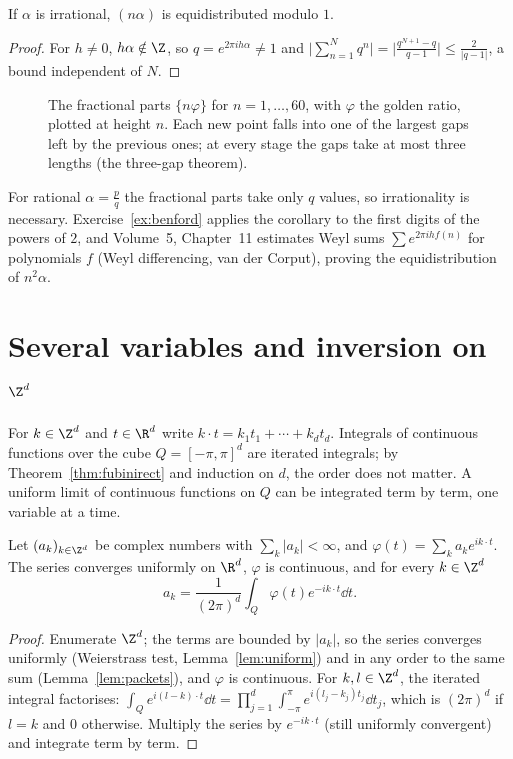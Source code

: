 \begin{corollary}\label{cor:nalpha}
If $\alpha$ is irrational, $(n\alpha)$ is equidistributed modulo $1$.
\end{corollary}
\begin{proof}
For $h\ne0$, $h\alpha\notin\Z$, so $q=e^{2\pi ih\alpha}\ne1$ and $\bigl|\sum_{n=1}^Nq^n\bigr|=\bigl|\frac{q^{N+1}-q}{q-1}\bigr|\le\frac2{|q-1|}$, a bound independent of $N$.
\end{proof}

\begin{figure}[ht]
\centering
{}
\caption{The fractional parts $\{n\varphi\}$ for $n=1,\dots,60$, with $\varphi$ the golden ratio, plotted at height $n$. Each new point
falls into one of the largest gaps left by the previous ones; at every stage the gaps take at most three lengths (the
three-gap theorem).}
\label{fig:weyl}
\end{figure}

For rational $\alpha=\frac pq$ the fractional parts take only $q$ values, so irrationality is necessary. Exercise~\ref{ex:benford} applies
the corollary to the first digits of the powers of $2$, and Volume~5, Chapter~11 estimates Weyl sums $\sum e^{2\pi ihf(n)}$ for polynomials $f$ (Weyl differencing, van der Corput), proving the equidistribution of $n^2\alpha$.

\section{Several variables and inversion on \texorpdfstring{$\Z^d$}{Zd}}

For $k\in\Z^d$ and $t\in\R^d$ write $k\cdot t=k_1t_1+\cdots+k_dt_d$. Integrals of continuous functions over the cube $Q=[-\pi,\pi]^d$ are iterated
integrals; by Theorem~\ref{thm:fubinirect} and induction on $d$, the order does not matter. A uniform limit of continuous functions on $Q$
can be integrated term by term, one variable at a time.

\begin{proposition}\label{prop:inversionZd}
Let $(a_k)_{k\in\Z^d}$ be complex numbers with $\sum_k|a_k|<\infty$, and $\varphi(t)=\sum_ka_ke^{ik\cdot t}$. The series converges uniformly on $\R^d$,
$\varphi$ is continuous, and for every $k\in\Z^d$
\[
a_k=\frac1{(2\pi)^d}\int_Q\varphi(t)e^{-ik\cdot t}\dd t.
\]
\end{proposition}
\begin{proof}
Enumerate $\Z^d$; the terms are bounded by $|a_k|$, so the series converges uniformly (Weierstrass test, Lemma~\ref{lem:uniform}) and
in any order to the same sum (Lemma~\ref{lem:packets}), and $\varphi$ is continuous. For $k,l\in\Z^d$, the iterated integral factorises:
$\int_Qe^{i(l-k)\cdot t}\dd t=\prod_{j=1}^d\int_{-\pi}^\pi e^{i(l_j-k_j)t_j}\dd t_j$, which is $(2\pi)^d$ if $l=k$ and $0$ otherwise. Multiply the series by $e^{-ik\cdot t}$
(still uniformly convergent) and integrate term by term.
\end{proof}

